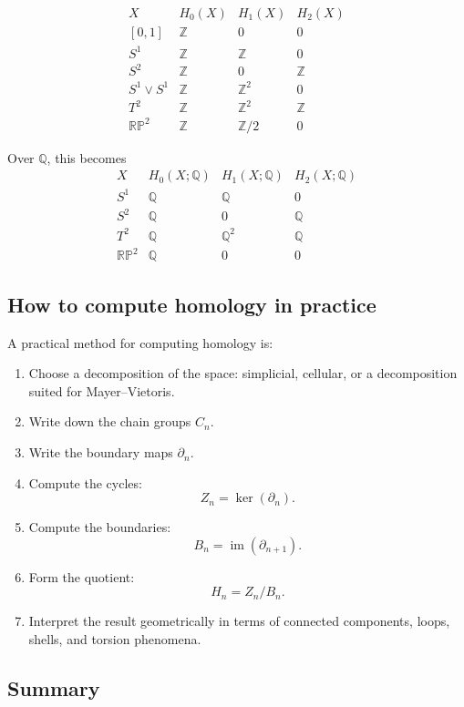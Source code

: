 \documentclass[12pt,a4paper]{article}
\theoremstyle{notespace}
\begin{document}
\[
\begin{array}{c|ccc}
	X & H_0(X) & H_1(X) & H_2(X)\\
	\hline
	[0,1] & \mathbb{Z} & 0 & 0\\
	S^1 & \mathbb{Z} & \mathbb{Z} & 0\\
	S^2 & \mathbb{Z} & 0 & \mathbb{Z}\\
	S^1\vee S^1 & \mathbb{Z} & \mathbb{Z}^2 & 0\\
	T^2 & \mathbb{Z} & \mathbb{Z}^2 & \mathbb{Z}\\
	\mathbb{RP}^2 & \mathbb{Z} & \mathbb{Z}/2 & 0
\end{array}
\]

Over \(\mathbb{Q}\), this becomes
\[
\begin{array}{c|ccc}
	X & H_0(X;\mathbb{Q}) & H_1(X;\mathbb{Q}) & H_2(X;\mathbb{Q})\\
	\hline
	S^1 & \mathbb{Q} & \mathbb{Q} & 0\\
	S^2 & \mathbb{Q} & 0 & \mathbb{Q}\\
	T^2 & \mathbb{Q} & \mathbb{Q}^2 & \mathbb{Q}\\
	\mathbb{RP}^2 & \mathbb{Q} & 0 & 0
\end{array}
\]

\subsection{How to compute homology in practice}

A practical method for computing homology is:

\begin{enumerate}
	\item Choose a decomposition of the space: simplicial, cellular, or a decomposition suited for Mayer--Vietoris.
	\item Write down the chain groups \(C_n\).
	\item Write the boundary maps \(\partial_n\).
	\item Compute the cycles:
	\[
	Z_n=\ker(\partial_n).
	\]
	\item Compute the boundaries:
	\[
	B_n=\operatorname{im}(\partial_{n+1}).
	\]
	\item Form the quotient:
	\[
	H_n=Z_n/B_n.
	\]
	\item Interpret the result geometrically in terms of connected components, loops, shells, and torsion phenomena.
\end{enumerate}

\subsection{Summary}
\end{document}

